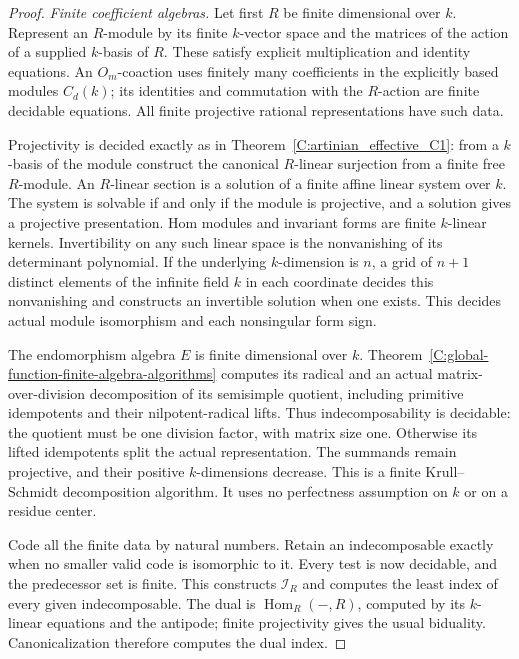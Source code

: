 \begin{proof}
\emph{Finite coefficient algebras.}
Let first $R$ be finite dimensional over $k$.
Represent an $R$-module by its finite
$k$-vector space and the matrices of the
action of a supplied $k$-basis of $R$.
These satisfy explicit multiplication
and identity equations.
An $O_m$-coaction uses finitely many
coefficients in the explicitly based
modules $C_d(k)$; its identities and
commutation with the $R$-action are
finite decidable equations.
All finite projective rational
representations have such data.

Projectivity is decided exactly as
in Theorem~\ref{C:artinian_effective_C1}:
from a $k$-basis of the module construct
the canonical $R$-linear surjection
from a finite free $R$-module.
An $R$-linear section is a solution
of a finite affine linear system
over $k$.
The system is solvable if and only
if the module is projective, and
a solution gives a projective
presentation.
Hom modules and invariant forms
are finite $k$-linear kernels.
Invertibility on any such linear
space is the nonvanishing of its
determinant polynomial.
If the underlying $k$-dimension
is $n$, a grid of $n+1$ distinct
elements of the infinite field
$k$ in each coordinate decides
this nonvanishing and constructs
an invertible solution when one
exists.
This decides actual module
isomorphism and each nonsingular
form sign.

The endomorphism algebra $E$
is finite dimensional over $k$.
Theorem~\ref{C:global-function-finite-algebra-algorithms}
computes its radical and an actual
matrix-over-division decomposition
of its semisimple quotient,
including primitive idempotents
and their nilpotent-radical lifts.
Thus indecomposability is decidable:
the quotient must be one division
factor, with matrix size one.
Otherwise its lifted idempotents
split the actual representation.
The summands remain projective,
and their positive $k$-dimensions
decrease.
This is a finite Krull--Schmidt
decomposition algorithm.
It uses no perfectness assumption
on $k$ or on a residue center.

Code all the finite data by
natural numbers.  Retain an
indecomposable exactly when no
smaller valid code is isomorphic
to it.
Every test is now decidable,
and the predecessor set is
finite.
This constructs $\mathscr I_R$
and computes the least index
of every given indecomposable.
The dual is $\operatorname{Hom}_R(-,R)$,
computed by its $k$-linear
equations and the antipode;
finite projectivity gives the
usual biduality.
Canonicalization therefore
computes the dual index.


\end{proof}
